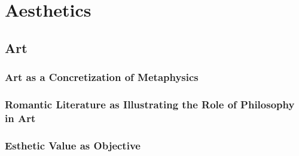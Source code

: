 \part{Aesthetics}

\chapter{Art}

    \section{Art as a Concretization of Metaphysics}

    \section{Romantic Literature as Illustrating the Role of Philosophy in Art}

    \section{Esthetic Value as Objective}